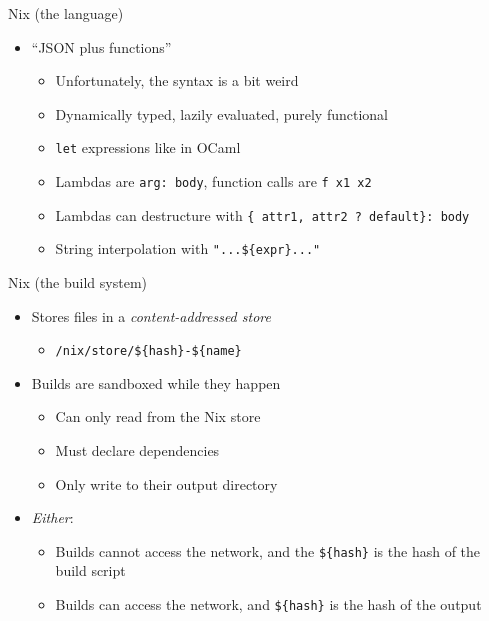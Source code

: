 \documentclass[aspectratio=169, notes]{beamer}
\begin{document}
\begin{frame}{Nix (the language)}
	\begin{itemize}
		\item ``JSON plus functions''
		      \begin{itemize}
			      \item Unfortunately, the syntax is a bit weird
			      \item Dynamically typed, lazily evaluated, purely functional
			      \item \texttt{let} expressions like in OCaml
			      \item Lambdas are \texttt{arg: body}, function calls are \texttt{f x1 x2}
			      \item Lambdas can destructure with \texttt{\{ attr1, attr2 ? default\}: body}
			      \item String interpolation with \texttt{"...\$\{expr\}..."}
		      \end{itemize}
	\end{itemize}
	
\end{frame}

\begin{frame}{Nix (the build system)}
	\begin{itemize}
		\item Stores files in a \emph{content-addressed store}
		      \begin{itemize}
			      \item \texttt{/nix/store/\$\{hash\}-\$\{name\}}
		      \end{itemize}
		\item Builds are sandboxed while they happen
		      \begin{itemize}
			      \item Can only read from the Nix store
			      \item Must declare dependencies
			      \item Only write to their output directory
		      \end{itemize}
		\item \emph{Either}:
		      \begin{itemize}
			      \item Builds cannot access the network, and the \texttt{\$\{hash\}} is the hash of the build script
			      \item Builds can access the network, and \texttt{\$\{hash\}} is the hash of the output
		      \end{itemize}
	\end{itemize}
\end{frame}
\end{document}
